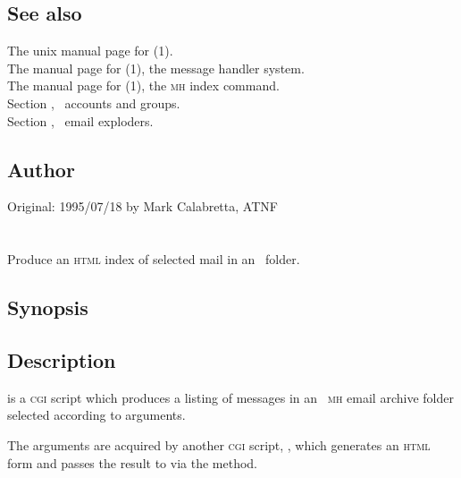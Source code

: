 \subsection*{See also}

The unix manual page for (1).\\
The manual page for (1), the message handler system.\\
The manual page for (1), the \textsc{mh} index command.\\
Section , \aipspp\ accounts and groups.\\
Section , \aipspp\ email exploders.

\subsection*{Author}

Original: 1995/07/18 by Mark Calabretta, ATNF


\newpage
\section{}
\label{scanpick}



Produce an \textsc{html} index of selected mail in an \aipspp\ folder.

\subsection*{Synopsis}

\begin{synopsis}
\end{synopsis}

\subsection*{Description}

 is a \textsc{cgi} script which produces a 
listing of messages in an \aipspp\ \textsc{mh} email archive folder selected
according to  arguments.

The  arguments are acquired by another \textsc{cgi} script,
, which generates an \textsc{html} form and passes the result
to  via the  method.

